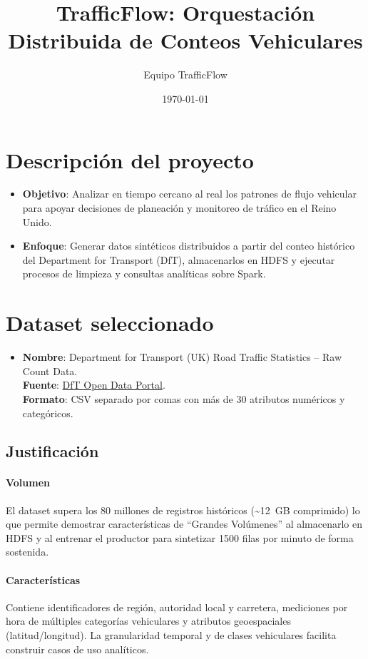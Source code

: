 \documentclass[11pt]{article}
\title{TrafficFlow: Orquestación Distribuida de Conteos Vehiculares}
\author{Equipo TrafficFlow}
\date{\today}
\begin{document}
\maketitle

\section{Descripción del proyecto}
\begin{itemize}[leftmargin=*]
  \item \textbf{Objetivo}: Analizar en tiempo cercano al real los patrones de flujo vehicular para apoyar decisiones de planeación y monitoreo de tráfico en el Reino Unido.
  \item \textbf{Enfoque}: Generar datos sintéticos distribuidos a partir del conteo histórico del Department for Transport (DfT), almacenarlos en HDFS y ejecutar procesos de limpieza y consultas analíticas sobre Spark.
\end{itemize}

\section{Dataset seleccionado}
\begin{itemize}[leftmargin=*]
  \item \textbf{Nombre}: Department for Transport (UK) Road Traffic Statistics -- Raw Count Data.\\
  \textbf{Fuente}: \href{https://roadtraffic.dft.gov.uk/downloads}{DfT Open Data Portal}.\\
  \textbf{Formato}: CSV separado por comas con más de 30 atributos numéricos y categóricos.
\end{itemize}

\subsection*{Justificación}
\paragraph{Volumen} El dataset supera los 80 millones de registros históricos (\textasciitilde{}12~GB comprimido) lo que permite demostrar características de ``Grandes Volúmenes'' al almacenarlo en HDFS y al entrenar el productor para sintetizar 1500 filas por minuto de forma sostenida.
\paragraph{Características} Contiene identificadores de región, autoridad local y carretera, mediciones por hora de múltiples categorías vehiculares y atributos geoespaciales (latitud/longitud). La granularidad temporal y de clases vehiculares facilita construir casos de uso analíticos.
\end{document}
